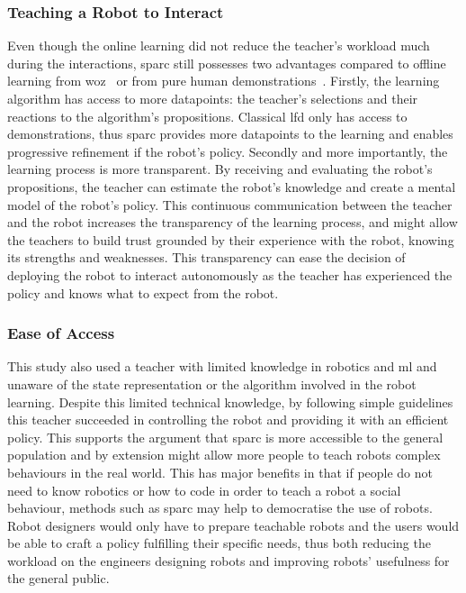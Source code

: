 \subsubsection{Teaching a Robot to Interact} \label{sec:tuto_disc_teaching}

Even though the online learning did not reduce the teacher's workload much during the interactions, \gls{sparc} still possesses two advantages compared to offline learning from \gls{woz}~\citep{sequeira2016discovering} or from pure human demonstrations~\citep{liu2014train}. Firstly, the learning algorithm has access to more datapoints: the teacher's selections and their reactions to the algorithm's propositions. Classical \gls{lfd} only has access to demonstrations, thus \gls{sparc} provides more datapoints to the learning and enables progressive refinement if the robot's policy. Secondly and more importantly, the learning process is more transparent. By receiving and evaluating the robot's propositions, the teacher can estimate the robot's knowledge and create a mental model of the robot's policy. This continuous communication between the teacher and the robot increases the transparency of the learning process, and might allow the teachers to build trust grounded by their experience with the robot, knowing its strengths and weaknesses. This transparency can ease the decision of deploying the robot to interact autonomously as the teacher has experienced the policy and knows what to expect from the robot.

\subsubsection{Ease of Access}

This study also used a teacher with limited knowledge in robotics and \gls{ml} and unaware of the state representation or the algorithm involved in the robot learning. Despite this limited technical knowledge, by following simple guidelines this teacher succeeded in controlling the robot and providing it with an efficient policy.
This supports the argument that \gls{sparc} is more accessible to the general population and by extension might allow more people to teach robots complex behaviours in the real world. This has major benefits in that if people do not need to know robotics or how to code in order to teach a robot a social behaviour, methods such as \gls{sparc} may help to democratise the use of robots. Robot designers would only have to prepare teachable robots and the users would be able to craft a policy fulfilling their specific needs, thus both reducing the workload on the engineers designing robots and improving robots' usefulness for the general public.


